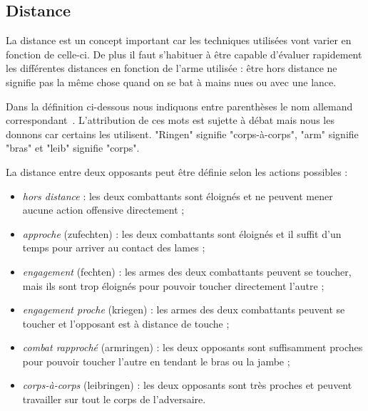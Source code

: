 


\subsection{Distance}


La distance est un concept important car les techniques utilisées vont varier en fonction de celle-ci.
De plus il faut s'habituer à être capable d'évaluer rapidement les différentes distances en fonction de l'arme utilisée : être hors distance ne signifie pas la même chose quand on se bat à mains nues ou avec une lance.

Dans la définition ci-dessous nous indiquons entre parenthèses le nom allemand correspondant~\cite{kronenburg:dijon:going_distance:2015}.
L'attribution de ces mots est sujette à débat mais nous les donnons car certains les utilisent.
"Ringen" signifie "corps-à-corps", "arm" signifie "bras" et "leib" signifie "corps".

\begin{definition}[Distances]

\noindent
La distance entre deux opposants peut être définie selon les actions possibles :
\begin{itemize}
	\item \emph{hors distance} : les deux combattants sont éloignés et ne peuvent mener aucune action offensive directement ;
	
	\item \emph{approche} (zufechten) : les deux combattants sont éloignés et il suffit d'un temps pour arriver au contact des lames ;
	
	\item \emph{engagement} (fechten) : les armes des deux combattants peuvent se toucher, mais ils sont trop éloignés pour pouvoir toucher directement l'autre ;
	
	\item \emph{engagement proche} (kriegen) : les armes des deux combattants peuvent se toucher et l'opposant est à distance de touche ;
	
	\item \emph{combat rapproché} (armringen) : les deux opposants sont suffisamment proches pour pouvoir toucher l'autre en tendant le bras ou la jambe ;
	
	\item \emph{corps-à-corps} (leibringen) : les deux opposants sont très proches et peuvent travailler sur tout le corps de l'adversaire.
\end{itemize}
\end{definition}


